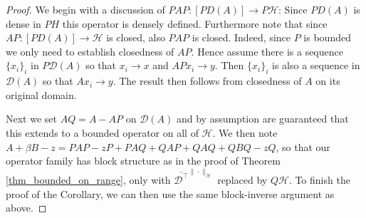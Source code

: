 \documentclass[reqno,12pt,letterpaper]{amsart}
\numberwithin{equation}{section}
\newcommand{\1}{\mathds{1}}
\theoremstyle{definition}
\begin{document}
\begin{proof}
	We begin with a discussion of $PAP: [P D(A)] \rightarrow P\mathcal{H}$: Since  $P D(A)$ is dense in $PH$ this operator is densely defined. Furthermore note that since  $AP: [P D(A)] \rightarrow \mathcal{H}$ is closed, also $PAP$ is closed. Indeed, since $P$ is bounded we only need to establish closedness of $AP$. Hence assume there is a sequence $\{x_i\}_i$ in $P\mathcal{D}(A)$ so that $x_i \rightarrow x$ and $APx_i \rightarrow y$. Then  $\{x_i\}_i$ is also a sequence in $\mathcal{D}(A)$ so that $Ax_i \rightarrow y$. The result then follows from closedness of $A$ on its original domain.
	
	Next we set $AQ = A - AP$ on $\mathcal{D}(A)$ and by assumption are guaranteed that this extends to a bounded operator on all of $\mathcal{H}$. We then note 
	$
	A + \beta B -z = PAP - zP + PAQ + QAP + QAQ + QBQ -zQ$,
	so that our operator family has block structure as in the proof of Theorem \ref{thm_bounded_on_range}, only with $\overline{\mathcal{D}^{\intercal}}^{\|\cdot\|_{\mathcal{H}}}$ replaced by $Q\mathcal{H}$. To finish the proof of the Corollary, we can then use the same block-inverse argument as above.
\end{proof}
\end{document}
